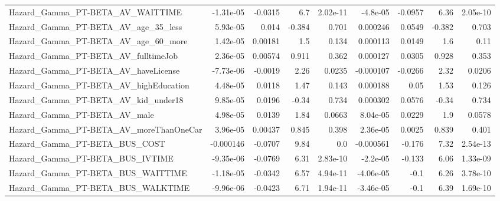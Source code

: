 \begin{tabular}{lrrrrrrrr}
Hazard\_Gamma\_PT-BETA\_AV\_WAITTIME                   &   -1.31e-05 &      -0.0315 &      6.7 & 2.02e-11 &   -4.8e-05 &     -0.0957 &         6.36 &      2.05e-10 \\
Hazard\_Gamma\_PT-BETA\_AV\_age\_35\_less                &    5.93e-05 &        0.014 &   -0.384 &    0.701 &   0.000246 &      0.0549 &       -0.382 &         0.703 \\
Hazard\_Gamma\_PT-BETA\_AV\_age\_60\_more                &    1.42e-05 &      0.00181 &      1.5 &    0.134 &   0.000113 &      0.0149 &          1.6 &          0.11 \\
Hazard\_Gamma\_PT-BETA\_AV\_fulltimeJob                &    2.36e-05 &      0.00574 &    0.911 &    0.362 &   0.000127 &      0.0305 &        0.928 &         0.353 \\
Hazard\_Gamma\_PT-BETA\_AV\_haveLicense                &   -7.73e-06 &      -0.0019 &     2.26 &   0.0235 &  -0.000107 &     -0.0266 &         2.32 &        0.0206 \\
Hazard\_Gamma\_PT-BETA\_AV\_highEducation              &    4.48e-05 &       0.0118 &     1.47 &    0.143 &   0.000188 &        0.05 &         1.53 &         0.126 \\
Hazard\_Gamma\_PT-BETA\_AV\_kid\_under18                &    9.85e-05 &       0.0196 &    -0.34 &    0.734 &   0.000302 &      0.0576 &        -0.34 &         0.734 \\
Hazard\_Gamma\_PT-BETA\_AV\_male                       &    4.98e-05 &       0.0139 &     1.84 &   0.0663 &   8.04e-05 &      0.0229 &          1.9 &        0.0578 \\
Hazard\_Gamma\_PT-BETA\_AV\_moreThanOneCar             &    3.96e-05 &      0.00437 &    0.845 &    0.398 &   2.36e-05 &      0.0025 &        0.839 &         0.401 \\
Hazard\_Gamma\_PT-BETA\_BUS\_COST                      &   -0.000146 &      -0.0707 &     9.84 &      0.0 &  -0.000561 &      -0.176 &         7.32 &      2.54e-13 \\
Hazard\_Gamma\_PT-BETA\_BUS\_IVTIME                    &   -9.35e-06 &      -0.0769 &     6.31 & 2.83e-10 &   -2.2e-05 &      -0.133 &         6.06 &      1.33e-09 \\
Hazard\_Gamma\_PT-BETA\_BUS\_WAITTIME                  &   -1.18e-05 &      -0.0342 &     6.57 & 4.94e-11 &  -4.06e-05 &        -0.1 &         6.26 &      3.78e-10 \\
Hazard\_Gamma\_PT-BETA\_BUS\_WALKTIME                  &   -9.96e-06 &      -0.0423 &     6.71 & 1.94e-11 &  -3.46e-05 &        -0.1 &         6.39 &      1.69e-10 \\

\end{tabular}
